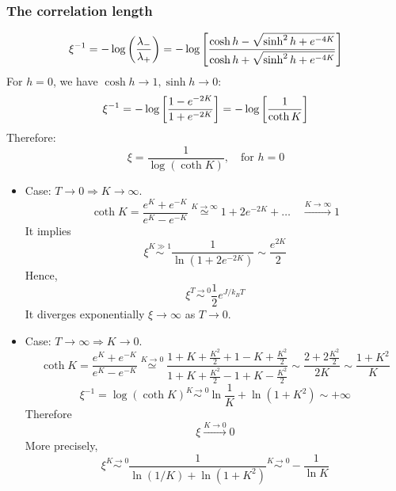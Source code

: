 \documentclass[../main/main.tex]{subfiles}
\begin{document}
\subsubsection{The correlation length}
\begin{equation}
  \xi ^{-1} = -\log{\qty(\frac{\lambda _-}{\lambda _+}) } = - \log{\qty[ \frac{\cosh h - \sqrt{\sinh^2 h + e^{-4K} } }{\cosh h + \sqrt{\sinh^2 h + e^{-4K} }}] }
\end{equation}
For \( h=0 \), we have \( \cosh h \rightarrow 1, \sinh h \rightarrow 0 \):
\begin{equation*}
  \xi ^{-1} = - \log{\qty[\frac{1- e^{-2K} }{1+ e^{-2K} }] } =  - \log{\qty[\frac{1 }{\coth K }] }
\end{equation*}
Therefore:
\begin{equation}
  \xi = \frac{1}{\log{ (\coth K )} }, \quad \text{for } h = 0
\end{equation}
\begin{itemize}
\item Case: \( T \rightarrow 0 \Rightarrow K \rightarrow \infty  \).
\begin{equation*}
  \coth K = \frac{e^{K} + e^{-K}  }{e^{K} - e^{-K}  } \overset{K \rightarrow \infty }{\simeq} 1 + 2 e^{-2K} + \dots \quad \overset{K \rightarrow \infty }{ \longrightarrow  } 1
\end{equation*}
It implies
\begin{equation*}
  \xi \overset{K \gg 1}{\sim } \frac{1}{\ln{(1+ 2 e^{-2K} )} } \sim \frac{e^{2K} }{2}
\end{equation*}
Hence,
\begin{equation}
  \xi \overset{T \rightarrow 0}{\sim } \frac{1}{2} e^{J/k_B T}
\end{equation}
It diverges exponentially \( \xi  \rightarrow \infty  \) as \( T \rightarrow 0 \).
\item Case: \( T \rightarrow \infty \Rightarrow K \rightarrow 0 \).
\begin{equation*}
  \coth K = \frac{e^{K} + e^{-K}  }{e^{K} - e^{-K}  } \overset{K \rightarrow 0 }{\simeq}
  \frac{1+K+\frac{K^2}{2}+1-K+\frac{K^2}{2}}{1+K+\frac{K^2}{2}-1+K-\frac{K^2}{2}}
  \sim \frac{2+2 \frac{K^2}{2}}{2K} \sim \frac{1+K^2}{K}
\end{equation*}
\begin{equation*}
  \xi ^{-1} = \log{(\coth K)} \overset{K \rightarrow 0}{\sim } \ln{\frac{1}{K}} + \ln{(1+K^2)} \sim + \infty
\end{equation*}
Therefore
\begin{equation*}
  \xi  \overset{K \rightarrow 0}{\longrightarrow} 0
\end{equation*}
More precisely,
\begin{equation}
  \xi \overset{K \rightarrow 0}{\sim } \frac{1}{\ln{(1/K)} + \ln{(1+K^2)}  } \overset{K \rightarrow 0}{\sim } - \frac{1}{\ln{K} }
\end{equation}

\end{itemize}
\end{document}
